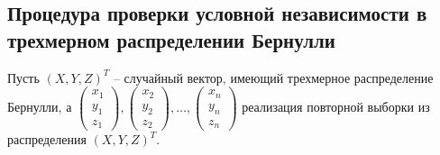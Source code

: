 \subsection{Процедура проверки условной независимости
в трехмерном распределении Бернулли}\label{twos}

Пусть $(X,Y,Z)^T$ -- случайный вектор, имеющий трехмерное распределение
Бернулли, а
$
\begin{pmatrix}
        x_1 \\
        y_1 \\
        z_1
    \end{pmatrix},
    \begin{pmatrix}
        x_2 \\
        y_2 \\
        z_2
    \end{pmatrix}, \ldots,
    \begin{pmatrix}
        x_n \\
        y_n \\
        z_n
    \end{pmatrix}
$ реализация повторной выборки из распределения $(X,Y,Z)^T$.

